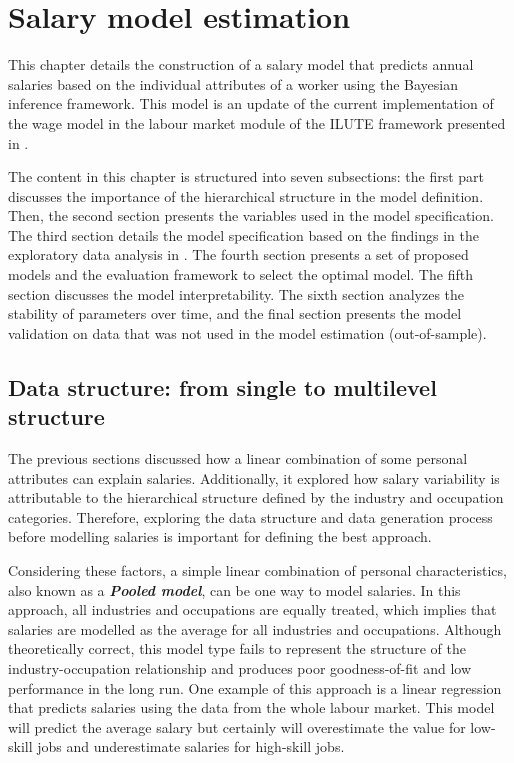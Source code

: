 \chapter{Salary model estimation}

This chapter details the construction of a salary model that predicts annual salaries based on the individual attributes of a worker using the Bayesian inference framework. This model is an update of the current implementation of the wage model in the labour market module of the ILUTE framework presented in . 

The content in this chapter is structured into seven subsections: the first part discusses the importance of the hierarchical structure in the model definition. Then, the second section presents the variables used in the model specification. The third section details the model specification based on the findings in the exploratory data analysis in . The fourth section presents a set of proposed models and the evaluation framework to select the optimal model. The fifth section discusses the model interpretability. The sixth section analyzes the stability of parameters over time, and the final section presents the model validation on data that was not used in the model estimation (out-of-sample). 

\section{Data structure: from single to multilevel structure}

The previous sections discussed how a linear combination of some personal attributes can explain salaries. Additionally, it explored how salary variability is attributable to the hierarchical structure defined by the industry and occupation categories. Therefore, exploring the data structure and data generation process before modelling salaries is important for defining the best approach. 

Considering these factors, a simple linear combination of personal characteristics, also known as a \textit{\textbf{Pooled model}}, can be one way to model salaries. In this approach, all industries and occupations are equally treated, which implies that salaries are modelled as the average for all industries and occupations. Although theoretically correct, this model type fails to represent the structure of the industry-occupation relationship and produces poor goodness-of-fit and low performance in the long run. One example of this approach is a linear regression that predicts salaries using the data from the whole labour market. This model will predict the average salary but certainly will overestimate the value for low-skill jobs and underestimate salaries for high-skill jobs. 

